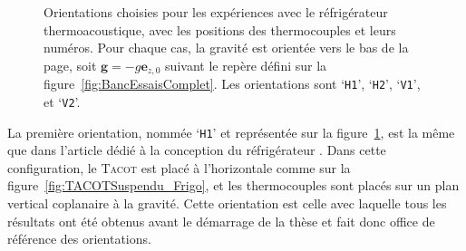 \begin{figure}[!htp]
	\centering		
	\begin{subfigure}[c]{.4\textwidth}
		\centering
		
		\caption{}
		\label{fig:OrientationCore_H1}
	\end{subfigure} 
	\begin{subfigure}[c]{.4\textwidth}
		\centering
		
		\caption{}
		\label{fig:OrientationCore_H2}
	\end{subfigure} 

	\vspace{1cm}
	
	\begin{subfigure}[c]{.4\textwidth}
		\centering
		
		\caption{}
		\label{fig:OrientationCore_V1}
	\end{subfigure} 
	\begin{subfigure}[c]{.4\textwidth}
		\centering
		
		\caption{}
		\label{fig:OrientationCore_V2}
	\end{subfigure}  	
 	\caption{Orientations choisies pour les expériences avec le réfrigérateur thermoacoustique, avec les positions des thermocouples et leurs numéros. Pour chaque cas, la gravité est orientée vers le bas de la page, soit $\mathbf g=-g\mathbf e_{z,0}$ suivant le repère défini sur la figure~\ref{fig:BancEssaisComplet}. Les orientations sont   `\texttt{H1}',  `\texttt{H2}',   `\texttt{V1}', et   `\texttt{V2}'.}%
    \label{fig:OrientationCore} %
\end{figure}


La première orientation, nommée `\texttt{H1}' et représentée sur la figure~\ref{fig:OrientationCore_H1}, est la même que dans l'article dédié à la conception du réfrigérateur \cite{ramadan_design_2021}. Dans cette configuration, le \textsc{Tacot} est placé à l'horizontale comme sur la figure~\ref{fig:TACOTSuspendu_Frigo}, et les thermocouples sont placés sur un plan vertical coplanaire à la gravité. Cette orientation est celle avec laquelle tous les résultats ont été obtenus avant le démarrage de la thèse et fait donc office de référence des orientations.\smallskip

